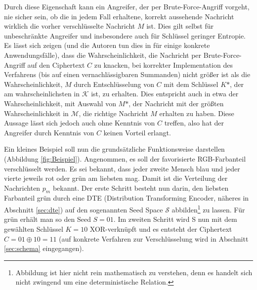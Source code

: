 Durch diese Eigenschaft kann ein Angreifer, der per Brute-Force-Angriff vorgeht, nie sicher sein, ob die in jedem Fall erhaltene, korrekt aussehende Nachricht wirklich die vorher verschlüsselte Nachricht \(M\) ist. Dies gilt selbst für unbeschränkte Angreifer und insbesondere auch für Schlüssel geringer Entropie. Es lässt sich zeigen (und die Autoren tun dies in \cite{EURO2014} für einige konkrete Anwendungsfälle), dass die Wahrscheinlichkeit, die Nachricht per Brute-Force-Angriff auf den Ciphertext \(C\) zu knacken, bei korrekter Implementation des Verfahrens (bis auf einen vernachlässigbaren Summanden) nicht größer ist als die Wahrscheinlichkeit, \(M\) durch Entschlüsselung von \(C\) mit dem Schlüssel \(K\text{*}\), der am wahrscheinlichsten in \(\mathcal{K}\) ist, zu erhalten. Dies entspricht auch in etwa der Wahrscheinlichkeit, mit Auswahl von \(M\text{*}\), der Nachricht mit der größten Wahrscheinlichkeit in \(\mathcal{M}\), die richtige Nachricht \(M\) erhalten zu haben. Diese Aussage lässt sich jedoch auch ohne Kenntnis von \(C\) treffen, also hat der Angreifer durch Kenntnis von \(C\) keinen Vorteil erlangt.

Ein kleines Beispiel soll nun die grundsätzliche Funktionsweise darstellen (Abbildung \ref{fig:Beispiel}). Angenommen, es soll der favorisierte RGB-Farbanteil verschlüsselt werden. Es sei bekannt, dass jeder zweite Mensch blau und jeder vierte jeweils rot oder grün am liebsten mag. Damit ist die Verteilung der Nachrichten \(p_m\) bekannt. Der erste Schritt besteht nun darin, den liebsten Farbanteil grün durch eine DTE (Distribution Transforming Encoder, näheres in Abschnitt \ref{sec:dte}) auf den sogenannten Seed Space \(\mathcal{S}\) abbilden\footnote{Abbildung ist hier nicht rein mathematisch zu verstehen, denn es handelt sich nicht zwingend um eine deterministische Relation.} zu lassen. Für grün erhält man so den Seed \(S=01\). Im zweiten Schritt wird S nun mit dem gewählten Schlüssel \(K=10\) XOR-verknüpft und es entsteht der Ciphertext \(C=01 \oplus 10 = 11\) (auf konkrete Verfahren zur Verschlüsselung wird in Abschnitt \ref{sec:schema} eingegangen).


